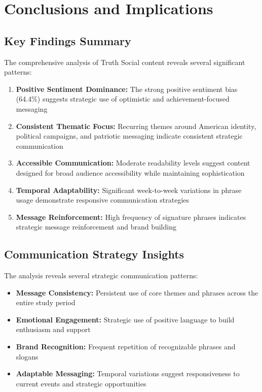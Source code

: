 \documentclass[12pt,a4paper]{article}
\begin{document}
\section{Conclusions and Implications}

\subsection{Key Findings Summary}

The comprehensive analysis of Truth Social content reveals several significant patterns:

\begin{enumerate}
    \item \textbf{Positive Sentiment Dominance:} The strong positive sentiment bias (64.4\%) suggests strategic use of optimistic and achievement-focused messaging
    
    \item \textbf{Consistent Thematic Focus:} Recurring themes around American identity, political campaigns, and patriotic messaging indicate consistent strategic communication
    
    \item \textbf{Accessible Communication:} Moderate readability levels suggest content designed for broad audience accessibility while maintaining sophistication
    
    \item \textbf{Temporal Adaptability:} Significant week-to-week variations in phrase usage demonstrate responsive communication strategies
    
    \item \textbf{Message Reinforcement:} High frequency of signature phrases indicates strategic message reinforcement and brand building
\end{enumerate}

\subsection{Communication Strategy Insights}

The analysis reveals several strategic communication patterns:

\begin{itemize}
    \item \textbf{Message Consistency:} Persistent use of core themes and phrases across the entire study period
    \item \textbf{Emotional Engagement:} Strategic use of positive language to build enthusiasm and support
    \item \textbf{Brand Recognition:} Frequent repetition of recognizable phrases and slogans
    \item \textbf{Adaptable Messaging:} Temporal variations suggest responsiveness to current events and strategic opportunities
\end{itemize}
\end{document}

